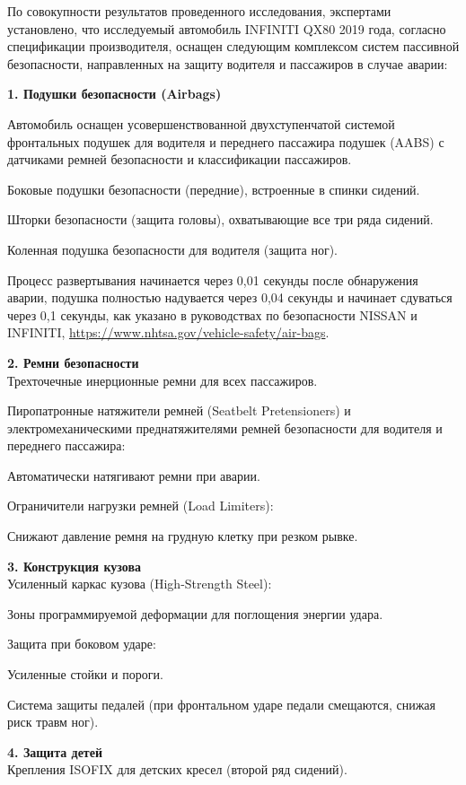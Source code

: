 По совокупности результатов проведенного исследования, экспертами установлено, что исследуемый автомобиль   INFINITI QX80 2019 года, согласно спецификации производителя,   оснащен следующим комплексом систем пассивной безопасности, направленных на защиту водителя и пассажиров в случае аварии:
 

 
\textbf{ \textbf{1. Подушки безопасности (Airbags)}}

Автомобиль оснащен усовершенствованной двухступенчатой  системой  фронтальных подушек для водителя и переднего пассажира подушек  (AABS) с датчиками ремней безопасности и классификации пассажиров.

 
 Боковые подушки безопасности (передние), встроенные в спинки сидений.
 
 Шторки безопасности (защита головы), охватывающие все три ряда сидений.
 
 Коленная подушка безопасности для водителя (защита ног).
 
 
Процесс развертывания начинается через 0,01 секунды после обнаружения аварии, подушка полностью надувается через 0,04 секунды и начинает сдуваться через 0,1 секунды, как указано в руководствах по безопасности NISSAN и INFINITI, \url{https://www.nhtsa.gov/vehicle-safety/air-bags}.
 
 
\textbf{\textbf{ 2. Ремни безопасности}\\}
 Трехточечные инерционные ремни для всех пассажиров.
 
 Пиропатронные натяжители ремней (Seatbelt Pretensioners) и электромеханическими преднатяжителями ремней безопасности для водителя и переднего пассажира:
 
 Автоматически натягивают ремни при аварии.
 
 Ограничители нагрузки ремней (Load Limiters):
 
 Снижают давление ремня на грудную клетку при резком рывке.
 
\textbf{\textbf{ 3. Конструкция кузова}\\}
 Усиленный каркас кузова (High-Strength Steel):
 
 Зоны программируемой деформации для поглощения энергии удара.
 
 Защита при боковом ударе:
 
 Усиленные стойки и пороги.
 
 Система защиты педалей (при фронтальном ударе педали смещаются, снижая риск травм ног).
 
\textbf{\textbf{ 4. Защита детей}\\}
 Крепления ISOFIX для детских кресел (второй ряд сидений).
 
